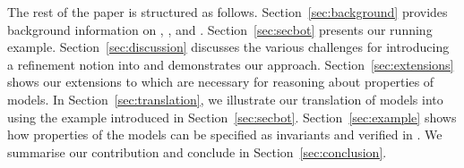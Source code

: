 The rest of the paper is structured as follows.  Section~\ref{sec:background} provides background information on \SCXML, \EventB, and \iUMLB.  Section~\ref{sec:secbot} presents our running example.  Section~\ref{sec:discussion} discusses the various challenges for introducing a refinement notion into \SCXML and demonstrates our approach.  Section~\ref{sec:extensions} shows our extensions to \SCXML which are necessary for reasoning about properties of \SCXML models.  In Section~\ref{sec:translation}, we illustrate our translation of \SCXML models into \EventB using the example introduced in Section~\ref{sec:secbot}.  Section~\ref{sec:example} shows how properties of the \SCXML models can be specified as invariants and verified in \EventB.  We summarise our contribution and conclude in Section~\ref{sec:conclusion}.

